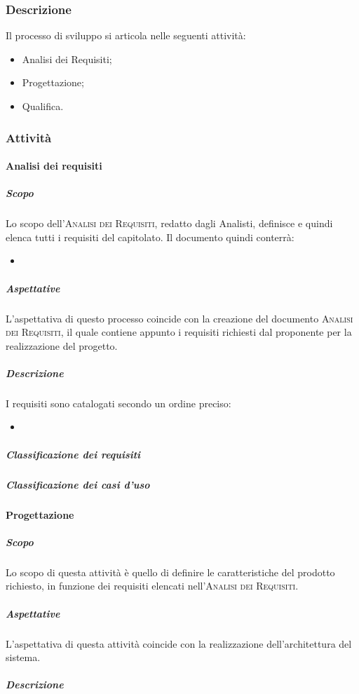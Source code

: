 \documentclass[../norme-di-progetto.tex]{subfiles}
\begin{document}
\subsubsection{Descrizione}
Il processo di sviluppo si articola nelle seguenti attività:
\begin{itemize}
  \item Analisi dei Requisiti;
  \item Progettazione;
  \item Qualifica.
\end{itemize}
\subsubsection{Attività}
\paragraph{Analisi dei requisiti}
\subparagraph{Scopo}
Lo scopo dell'\textsc{Analisi dei Requisiti}, redatto dagli Analisti, definisce e quindi elenca tutti i requisiti del capitolato. Il documento quindi conterrà:
\begin{itemize}
  \item %
\end{itemize}
\subparagraph{Aspettative}
L'aspettativa di questo processo coincide con la creazione del documento \textsc{Analisi dei Requisiti}, il quale contiene appunto i requisiti richiesti dal proponente per la realizzazione del progetto.
\subparagraph{Descrizione}
I requisiti sono catalogati secondo un ordine preciso:
\begin{itemize}
  \item %
\end{itemize}
\subparagraph{Classificazione dei requisiti}
\subparagraph{Classificazione dei casi d'uso}

\paragraph{Progettazione}
\subparagraph{Scopo}
Lo scopo di questa attività è quello di definire le caratteristiche del prodotto richiesto, in funzione dei requisiti elencati nell'\textsc{Analisi dei Requisiti}.
\subparagraph{Aspettative}
L'aspettativa di questa attività coincide con la realizzazione dell'architettura del sistema.
\subparagraph{Descrizione}
\end{document}
